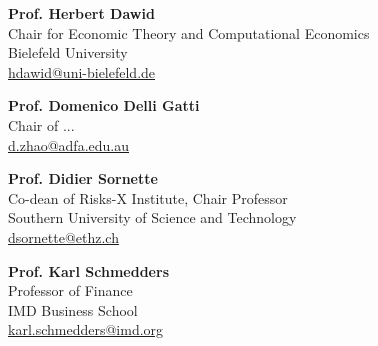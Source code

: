 \documentclass[11pt,a4paper]{article}
\begin{document}
\begin{minipage}[t]{0.5\textwidth}

\textbf{Prof. Herbert Dawid} \\
Chair for Economic Theory and Computational Economics\\
Bielefeld University\\
\href{mailto:hdawid@uni-bielefeld.de}{hdawid@uni-bielefeld.de}
\vspace{1em}


\textbf{Prof. Domenico Delli Gatti} \\
Chair of ... \\
\href{mailto:...}{d.zhao@adfa.edu.au}


\textbf{Prof. Didier Sornette} \\
Co-dean of Risks-X Institute, Chair Professor \\
Southern University of Science and Technology \\
\href{mailto:dsornette@ethz.ch}{dsornette@ethz.ch} \\
\end{minipage}%
\hfill
\begin{minipage}[t]{0.38\textwidth}
\textbf{Prof. Karl Schmedders} \\
Professor of Finance \\
IMD Business School \\
\href{mailto:karl.schmedders@imd.org}{karl.schmedders@imd.org} \\

\end{minipage}
\end{document}
